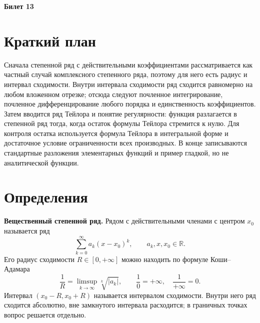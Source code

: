 \documentclass[12pt,a4paper]{article}
\newcommand{\R}{\mathbb{R}}
\begin{document}
\begin{center}
{\Large\bfseries Билет 13}
\end{center}

\noindent{}

\section*{Краткий план}

Сначала степенной ряд с действительными коэффициентами рассматривается как
частный случай комплексного степенного ряда, поэтому для него есть радиус и
интервал сходимости. Внутри интервала сходимости ряд сходится равномерно на
любом вложенном отрезке; отсюда следуют почленное интегрирование,
почленное дифференцирование любого порядка и единственность коэффициентов.
Затем вводится ряд Тейлора и понятие регулярности: функция разлагается в
степенной ряд тогда, когда остаток формулы Тейлора стремится к нулю. Для
контроля остатка используется формула Тейлора в интегральной форме и
достаточное условие ограниченности всех производных. В конце записываются
стандартные разложения элементарных функций и пример гладкой, но не
аналитической функции.

\section*{Определения}

\textbf{Вещественный степенной ряд.}
Рядом с действительными членами с центром \(x_0\) называется ряд
\[
  \sum_{k=0}^{\infty} a_k(x-x_0)^k,
  \qquad a_k,x,x_0\in\R.
\]
Его радиус сходимости \(R\in[0,+\infty]\) можно находить по формуле
Коши--Адамара
\[
  \frac1R=\limsup_{k\to\infty}\sqrt[k]{|a_k|},
  \qquad \frac10=+\infty,\quad \frac1{+\infty}=0.
\]
Интервал \((x_0-R,x_0+R)\) называется интервалом сходимости. Внутри него
ряд сходится абсолютно, вне замкнутого интервала расходится; в граничных
точках вопрос решается отдельно.
\end{document}
